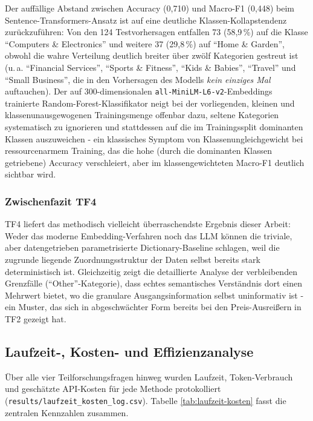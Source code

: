 Der auffällige Abstand zwischen Accuracy (0{,}710) und Macro-F1 (0{,}448) beim
Sentence-Transformers-Ansatz ist auf eine deutliche Klassen-Kollapstendenz
zurückzuführen: Von den 124 Testvorhersagen entfallen 73 (58,9\,\%) auf die
Klasse \enquote{Computers \& Electronics} und weitere 37 (29,8\,\%) auf
\enquote{Home \& Garden}, obwohl die wahre Verteilung deutlich breiter über
zwölf Kategorien gestreut ist (u.\,a. \enquote{Financial Services},
\enquote{Sports \& Fitness}, \enquote{Kids \& Babies}, \enquote{Travel} und
\enquote{Small Business}, die in den Vorhersagen des Modells \emph{kein
einziges Mal} auftauchen). Der auf 300-dimensionalen
\texttt{all-MiniLM-L6-v2}-Embeddings trainierte Random-Forest-Klassifikator
neigt bei der vorliegenden, kleinen und klassenunausgewogenen Trainingsmenge
offenbar dazu, seltene Kategorien systematisch zu ignorieren und stattdessen
auf die im Trainingssplit dominanten Klassen auszuweichen - ein klassisches
Symptom von Klassenungleichgewicht bei ressourcenarmem Training, das die
hohe (durch die dominanten Klassen getriebene) Accuracy verschleiert, aber im
klassengewichteten Macro-F1 deutlich sichtbar wird.

\subsubsection*{Zwischenfazit TF4}

TF4 liefert das methodisch vielleicht überraschendste Ergebnis dieser Arbeit:
Weder das moderne Embedding-Verfahren noch das LLM können die triviale,
aber datengetrieben parametrisierte Dictionary-Baseline schlagen, weil die
zugrunde liegende Zuordnungsstruktur der Daten selbst bereits stark
deterministisch ist. Gleichzeitig zeigt die detaillierte Analyse der
verbleibenden Grenzfälle (\enquote{Other}-Kategorie), dass echtes semantisches
Verständnis dort einen Mehrwert bietet, wo die granulare Ausgangsinformation
selbst uninformativ ist - ein Muster, das sich in abgeschwächter Form bereits
bei den Preis-Ausreißern in TF2 gezeigt hat.

\subsection{Laufzeit-, Kosten- und Effizienzanalyse}
\label{sec:laufzeit-kosten}

Über alle vier Teilforschungsfragen hinweg wurden Laufzeit, Token-Verbrauch
und geschätzte API-Kosten für jede Methode protokolliert
(\texttt{results/laufzeit\_kosten\_log.csv}). Tabelle
\ref{tab:laufzeit-kosten} fasst die zentralen Kennzahlen zusammen.

